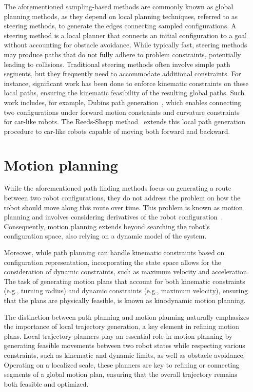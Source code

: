The aforementioned sampling-based methods are commonly known as global planning methods, as they depend on local planning techniques, referred to as steering methods, to generate the edges connecting sampled configurations. 
A steering method is a local planner that connects an initial configuration to a goal without accounting for obstacle avoidance. 
While typically fast, steering methods may produce paths that do not fully adhere to problem constraints, potentially leading to collisions.
Traditional steering methods often involve simple path segments, but they frequently need to accommodate additional constraints.
For instance, significant work has been done to enforce kinematic constraints on these local paths, ensuring the kinematic feasibility of the resulting global paths.
Such work includes, for example, Dubins path generation~\cite{cDubins}, which enables connecting two configurations under forward motion constraints and curvature constraints for car-like robots. 
The Reeds-Shepp method~\cite{cReeds} extends this local path generation procedure to car-like robots capable of moving both forward and backward.

\section{Motion planning}\label{sec:forwardplanning}

While the aforementioned path finding methods focus on generating a route between two robot configurations, they do not address the problem on how the robot should move along this route over time.
This problem is known as motion planning and involves considering derivatives of the robot configuration~\cite{cKroger}.
Consequently, motion planning extends beyond searching the robot's configuration space, also relying on a dynamic model of the system.

Moreover, while path planning can handle kinematic constraints based on configuration representation, incorporating the state space allows for the consideration of dynamic constraints, such as maximum velocity and acceleration. 
The task of generating motion plans that account for both kinematic constraints (e.g., turning radius) and dynamic constraints (e.g., maximum velocity), ensuring that the plans are physically feasible, is known as kinodynamic motion planning.

The distinction between path planning and motion planning naturally emphasizes the importance of local trajectory generation, a key element in refining motion plans. 
Local trajectory planners play an essential role in motion planning by generating feasible movements between two robot states while respecting various constraints, such as kinematic and dynamic limits, as well as obstacle avoidance. 
Operating on a localized scale, these planners are key to refining or connecting segments of a global motion plan, ensuring that the overall trajectory remains both feasible and optimized.

